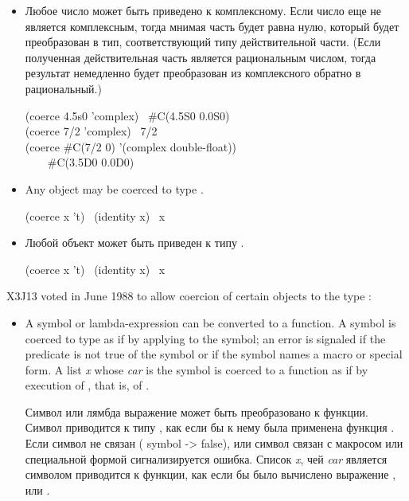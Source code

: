 \begin{defun}[Function]
\begin{itemize}
\item
Любое число может быть приведено к комплексному. Если число еще не является
комплексным, тогда мнимая часть будет равна нулю, который будет преобразован в
тип, соответствующий типу действительной части. (Если полученная действительная
часть является рациональным числом, тогда результат немедленно будет
преобразован из комплексного обратно в рациональный.)

\begin{lisp}
(coerce 4.5s0 'complex) \EV\ \#C(4.5S0 0.0S0) \\
(coerce 7/2 'complex) \EV\ 7/2 \\
(coerce \#C(7/2 0) '(complex double-float)) \\
~~~\EV\ \#C(3.5D0 0.0D0)
\end{lisp}

\item
Any object may be coerced to type .
\begin{lisp}
(coerce x 't) \EQ\ (identity x) \EQ\ x
\end{lisp}

\item
Любой объект может быть приведен к типу .
\begin{lisp}
(coerce x 't) \EQ\ (identity x) \EQ\ x
\end{lisp}

\end{itemize}

\begin{newer}
X3J13 voted in June 1988 
to allow coercion of certain objects to the type :
\begin{itemize}
\item
A symbol or lambda-expression can be converted to a function.
A symbol is coerced to type  as if by applying
 to the symbol; an error is signaled if the predicate
 is not true of
the symbol or if the symbol names a macro or special form.
A list \textit{x} whose \textit{car} is the symbol 
is coerced to a function as if by execution of ,
that is, of .

Символ или лямбда выражение может быть преобразовано к функции.
Символ приводится к типу , как если бы к нему была применена
функция . Если символ не связан ( symbol ->
false), или символ связан с макросом или специальной формой сигнализируется
ошибка.
Список \textit{x}, чей \textit{car} является символом  приводится к
функции, как если бы было вычислено выражение ,
или .
\end{itemize}
\end{newer}


\end{defun}
